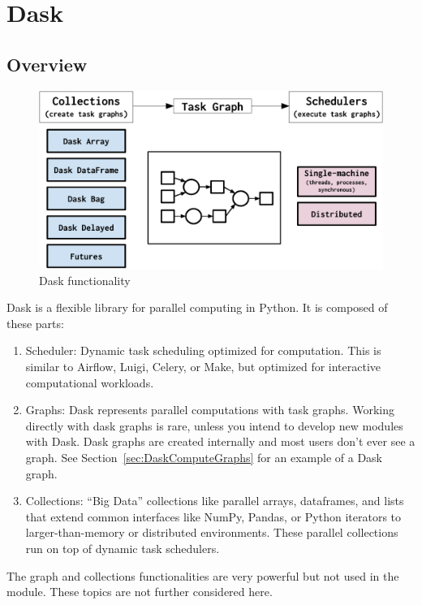 

\chapter{Dask}
\label{chap:Dask}

\section{Overview}
\label{sec:DaskOverview}


\begin{figure}[htbp]
    \centering
\includegraphics[width=.75\textwidth]{pic/dask-overview}
    \caption{Dask functionality \cite{daskhomepage2020}}
    \label{fig:dask-overview}
\end{figure}



Dask \cite{daskhomepage2020} is a flexible library for parallel computing in Python.
It is composed of these parts:
\begin{enumerate}
\item Scheduler: Dynamic task scheduling optimized for computation. This is similar to Airflow, Luigi, Celery, or Make, but optimized for interactive computational workloads.
\item Graphs: Dask represents parallel computations with task graphs.  Working directly with dask graphs is rare, unless you intend to develop new modules with Dask. Dask graphs are created internally and most users don't ever see a graph. See Section~\ref{sec:DaskComputeGraphs} for an example of a Dask graph.
\item Collections: ``Big Data'' collections like parallel arrays, dataframes, and lists that extend common interfaces like NumPy, Pandas, or Python iterators to larger-than-memory or distributed environments. These parallel collections run on top of dynamic task schedulers.
\end{enumerate}

The graph and collections functionalities are very powerful but not used in the \libraddask{} module. These topics are not further considered here.


